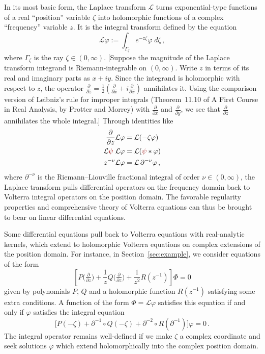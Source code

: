 \documentclass[final]{siamart220329}
\newcommand{\laplace}{\mathcal{L}}
\newenvironment{verify}{\color{veriforest}}{\color{black}}
\newenvironment{revtwo}{\color{revred}}{\color{black}}
\newcommand{\revtwotext}[1]{\textcolor{revred}{#1}}
\newenvironment{revtwo}{}{}
\newcommand{\revtwotext}[1]{#1}
\begin{document}
\begin{revtwo}
In its most basic form, the Laplace transform $\laplace$ turns exponential-type functions of a real ``position'' variable $\zeta$ into holomorphic functions of a complex ``frequency'' variable $z$. It is the integral transform defined by the equation
\[ \laplace \varphi := \int_{\Gamma_\zeta} e^{-z\zeta} \varphi\;d\zeta\,, \]
where $\Gamma_\zeta$ is the ray $\zeta \in (0, \infty)$.     
\end{revtwo}
\begin{verify}[Suppose the magnitude of the Laplace transform integrand is Riemann-integrable on $(0, \infty)$. Write $z$ in terms of its real and imaginary parts as $x + iy$. Since the integrand is holomorphic with respect to $z$, the operator $\frac{\partial}{\partial\overline{z}} = \frac{1}{2}\left(\frac{\partial}{\partial x} + i\frac{\partial}{\partial x}\right)$ annihilates it. Using the comparison version of Leibniz's rule for improper integrals (Theorem~11.10 of A First Course in Real Analysis, by Protter and Morrey) with $\frac{\partial}{\partial x}$ and $\frac{\partial}{\partial y}$, we see that $\frac{\partial}{\partial\overline{z}}$ annihilates the whole integral.]\end{verify} Through identities like
\begin{align*}
\frac{\partial}{\partial z} \laplace \varphi & = \laplace(-\zeta\varphi) \\
\laplace \revtwotext{\psi}\;\laplace\varphi & = \laplace(\revtwotext{\psi} * \varphi) \\
z^{-\nu} \laplace \varphi & = \laplace\,\partial^{-\nu} \varphi\,,
\end{align*}
where $\partial^{-\nu}$ is the Riemann--Liouville fractional integral of order $\nu \in (0, \infty)$, the Laplace transform pulls differential operators on the frequency domain back to Volterra integral operators on the position domain. The favorable regularity properties and comprehensive theory of Volterra equations can thus be brought to bear on linear differential equations.

Some differential equations pull back to Volterra equations with real-analytic kernels, which extend to holomorphic Volterra equations on complex extensions of the position domain. For instance, in Section~\ref{sec:example}, we consider equations of the form
\begin{equation}\label{eqn:intro-level-1}
\left[ P\big(\tfrac{\partial}{\partial z}\big) + \frac{1}{z} Q\big(\tfrac{\partial}{\partial z}\big) + \frac{1}{z^2} R(z^{-1}) \right] \Phi = 0
\end{equation}
given by polynomials $P$, $Q$ and a holomorphic function $R(z^{-1})$ satisfying some extra conditions. A function of the form $\Phi = \laplace \varphi$ satisfies this equation if and only if $\varphi$ satisfies the integral equation
\begin{equation}\label{eqn:intro-use-dict}
\big[ P(-\zeta)+\partial^{-1}\circ Q(-\zeta)+\partial^{-2}\circ R(\partial^{-1}) \big] \varphi = 0\,.
\end{equation}
The integral operator remains well-defined if we make $\zeta$ a complex coordinate and seek solutions $\varphi$ which extend holomorphically into the complex position domain.
\end{document}
